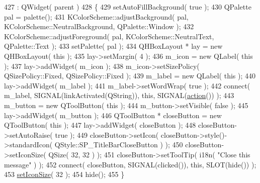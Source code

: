 \begin{DoxyCode}
427     : QWidget( parent )
428 \{
429     setAutoFillBackground( \textcolor{keyword}{true} );
430     QPalette pal = palette();
431     KColorScheme::adjustBackground( pal, KColorScheme::NeutralBackground, QPalette::Window );
432     KColorScheme::adjustForeground( pal, KColorScheme::NeutralText, QPalette::Text );
433     setPalette( pal );
434     QHBoxLayout * lay = \textcolor{keyword}{new} QHBoxLayout( \textcolor{keyword}{this} );
435     lay->setMargin( 4 );
436     m\_icon = \textcolor{keyword}{new} QLabel( \textcolor{keyword}{this} );
437     lay->addWidget( m\_icon );
438     m\_icon->setSizePolicy( QSizePolicy::Fixed, QSizePolicy::Fixed );
439     m\_label = \textcolor{keyword}{new} QLabel( \textcolor{keyword}{this} );
440     lay->addWidget( m\_label );
441     m\_label->setWordWrap( \textcolor{keyword}{true} );
442     connect( m\_label, SIGNAL(linkActivated(QString)), \textcolor{keyword}{this}, SIGNAL(\hyperlink{classPageViewTopMessage_ace79163bbe2ecbbf0e3485e71a8b74d7}{action}()) );
443     m\_button = \textcolor{keyword}{new} QToolButton( \textcolor{keyword}{this} );
444     m\_button->setVisible( \textcolor{keyword}{false} );
445     lay->addWidget( m\_button );
446     QToolButton * closeButton = \textcolor{keyword}{new} QToolButton( \textcolor{keyword}{this} );
447     lay->addWidget( closeButton );
448     closeButton->setAutoRaise( \textcolor{keyword}{true} );
449     closeButton->setIcon( closeButton->style()->standardIcon( QStyle::SP\_TitleBarCloseButton ) );
450     closeButton->setIconSize( QSize( 32, 32 ) );
451     closeButton->setToolTip( i18n( \textcolor{stringliteral}{"Close this message"} ) );
452     connect( closeButton, SIGNAL(clicked()), \textcolor{keyword}{this}, SLOT(hide()) );
453     \hyperlink{classPageViewTopMessage_a84bd8394be1e53e1916417875cc571a3}{setIconSize}( 32 );
454     hide();
455 \}
\end{DoxyCode}


